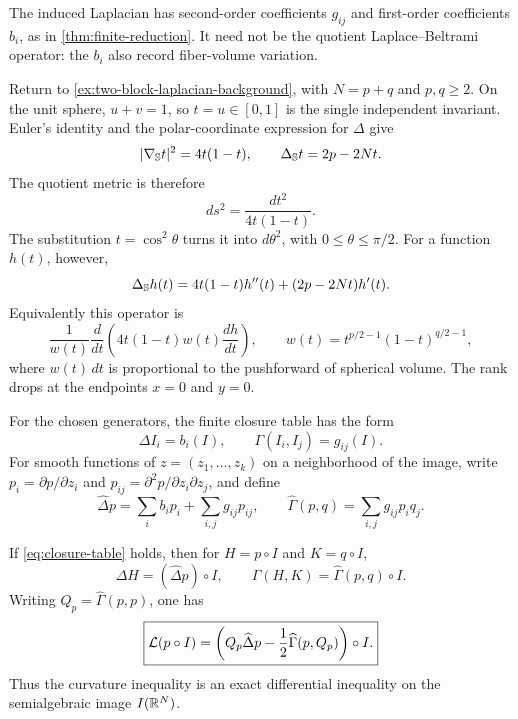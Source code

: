 The induced Laplacian has second-order coefficients \(g_{ij}\) and
first-order coefficients \(b_i\), as in \cref{thm:finite-reduction}.
It need not be the quotient Laplace--Beltrami operator: the \(b_i\)
also record fiber-volume variation.

\begin{example}
\label{ex:two-block-quotient-background}
Return to \cref{ex:two-block-laplacian-background}, with
\(N=p+q\) and \(p,q\geq2\). On the unit sphere, \(u+v=1\),
so \(t=u\in[0,1]\) is the single independent invariant. Euler's
identity and the polar-coordinate expression for \(\Delta\) give
\[
 |\nabla_{\mathbb S}t|^2=4t(1-t),\qquad
 \Delta_{\mathbb S}t=2p-2Nt.
\]
The quotient metric is therefore
\[
 ds^2=\frac{dt^2}{4t(1-t)}.
\]
The substitution \(t=\cos^2\theta\) turns it into \(d\theta^2\),
with \(0\leq\theta\leq\pi/2\). For a function \(h(t)\), however,
\[
 \Delta_{\mathbb S}h(t)=4t(1-t)h''(t)+(2p-2Nt)h'(t).
\]
Equivalently this operator is
\[
 \frac1{w(t)}\frac{d}{dt}
       \left(4t(1-t)w(t)\frac{dh}{dt}\right),
 \qquad w(t)=t^{p/2-1}(1-t)^{q/2-1},
\]
where \(w(t)\,dt\) is proportional to the pushforward of spherical
volume. The rank drops at the endpoints \(x=0\) and \(y=0\).
\end{example}

For the chosen generators, the finite closure table has the form
\begin{equation}\label{eq:closure-table}
 \Delta I_i=b_i(I),\qquad
 \Gamma(I_i,I_j)=g_{ij}(I).
\end{equation}
For smooth functions of \(z=(z_1,\ldots,z_k)\) on a neighborhood of
the image, write \(p_i=\partial p/\partial z_i\) and
\(p_{ij}=\partial^2p/\partial z_i\partial z_j\), and define
\[
 \widehat\Delta p=\sum_i b_i p_i+\sum_{i,j}g_{ij}p_{ij},
 \qquad
 \widehat\Gamma(p,q)=\sum_{i,j}g_{ij}p_iq_j.
\]

\begin{theorem}
\label{thm:finite-reduction}
If \eqref{eq:closure-table} holds, then for \(H=p\circ I\) and
\(K=q\circ I\),
\[
 \Delta H=(\widehat\Delta p)\circ I,
 \qquad
 \Gamma(H,K)=\widehat\Gamma(p,q)\circ I.
\]
Writing \(Q_p=\widehat\Gamma(p,p)\), one has
\begin{equation}\label{eq:reduced-L}
 \boxed{
 \mathcal L(p\circ I)=
 \left(Q_p\widehat\Delta p-
 \frac12\widehat\Gamma(p,Q_p)\right)\circ I.}
\end{equation}
Thus the curvature inequality is an exact differential inequality on the
semialgebraic image \(I(\mathbb R^N)\).
\end{theorem}

